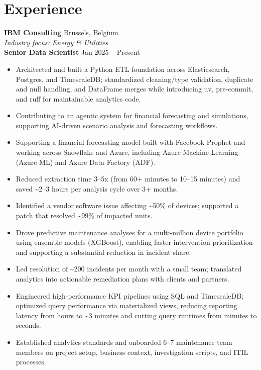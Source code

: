 \documentclass[10pt,a4paper]{article}
\begin{document}
\section*{Experience}
\textbf{IBM Consulting} \hfill Brussels, Belgium\\
\textit{Industry focus: Energy \& Utilities}\\
\textbf{Senior Data Scientist} \hfill Jan 2025 -- Present\\
\begin{itemize}
  \item Architected and built a Python ETL foundation across Elasticsearch, Postgres, and TimescaleDB; standardized cleaning/type validation, duplicate and null handling, and DataFrame merges while introducing uv, pre-commit, and ruff for maintainable analytics code.
  \item Contributing to an agentic system for financial forecasting and simulations, supporting AI-driven scenario analysis and forecasting workflows.
  \item Supporting a financial forecasting model built with Facebook Prophet and working across Snowflake and Azure, including Azure Machine Learning (Azure ML) and Azure Data Factory (ADF).
  \item Reduced extraction time 3--5x (from 60+ minutes to 10--15 minutes) and saved \textasciitilde{}2--3 hours per analysis cycle over 3+ months.
  \item Identified a vendor software issue affecting \textasciitilde{}50\% of devices; supported a patch that resolved \textasciitilde{}99\% of impacted units.
  \item Drove predictive maintenance analyses for a multi-million device portfolio using ensemble models (XGBoost), enabling faster intervention prioritization and supporting a substantial reduction in incident share.
  \item Led resolution of \textasciitilde{}200 incidents per month with a small team; translated analytics into actionable remediation plans with clients and partners.
  \item Engineered high-performance KPI pipelines using SQL and TimescaleDB; optimized query performance via materialized views, reducing reporting latency from hours to \textasciitilde{}3 minutes and cutting query runtimes from minutes to seconds.
  \item Established analytics standards and onboarded 6--7 maintenance team members on project setup, business context, investigation scripts, and ITIL processes.
\end{itemize}
\end{document}
